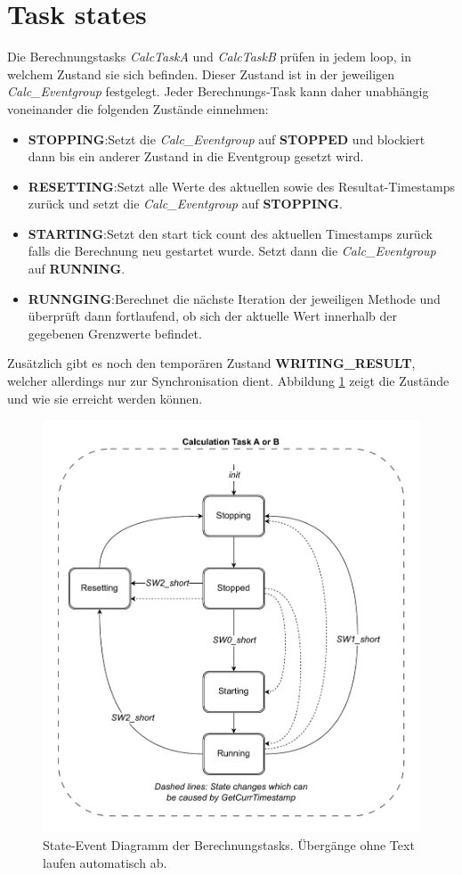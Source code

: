 \documentclass[ngerman,10pt,a4paper,titlepage]{report}
\begin{document}
	\section{Task states}\label{TaskStates}
	Die Berechnungstasks \textit{CalcTaskA} und \textit{CalcTaskB} prüfen in jedem loop, in welchem Zustand sie sich befinden. Dieser Zustand ist in der jeweiligen \textit{Calc\_Eventgroup} festgelegt. 
	Jeder Berechnungs-Task kann daher unabhängig voneinander die folgenden Zustände einnehmen:
	\begin{itemize}
		\item \textbf{STOPPING}:\tabto{3cm}Setzt die \textit{Calc\_Eventgroup} auf \textbf{STOPPED} und blockiert dann bis ein anderer Zustand in die Eventgroup gesetzt wird.
		\item \textbf{RESETTING}:\tabto{3cm}Setzt alle Werte des aktuellen sowie des Resultat-Timestamps zurück und setzt die \textit{Calc\_Eventgroup} auf \textbf{STOPPING}.
		\item \textbf{STARTING}:\tabto{3cm}Setzt den start tick count des aktuellen Timestamps zurück falls die Berechnung neu gestartet wurde. Setzt dann die \textit{Calc\_Eventgroup} auf \textbf{RUNNING}.
		\item \textbf{RUNNGING}:\tabto{3cm}Berechnet die nächste Iteration der jeweiligen Methode und überprüft dann fortlaufend, ob sich der aktuelle Wert innerhalb der gegebenen Grenzwerte befindet.
	\end{itemize}
	Zusätzlich gibt es noch den temporären Zustand \textbf{WRITING\_RESULT}, welcher allerdings nur zur Synchronisation dient. Abbildung \ref{fig:stateeventcalctasks} zeigt die Zustände und wie sie erreicht werden können.
	\begin{figure}
		\centering
		\includegraphics[width=0.7\linewidth]{diagrams/StateEvent_CalcTasks}
		\caption{State-Event Diagramm der Berechnungstasks. Übergänge ohne Text laufen automatisch ab.}
		\label{fig:stateeventcalctasks}
	\end{figure}
\end{document}
